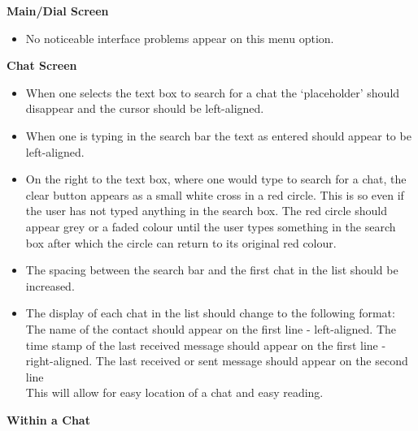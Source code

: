 \documentclass[11pt]{article}
\begin{document}
\textbf{Main/Dial Screen}
\begin{itemize}
\item No noticeable interface problems appear on this menu option.
\end{itemize}

\textbf{Chat Screen}
\begin{itemize}
\item	When one selects the text box to search for a chat the ‘placeholder’ should disappear and the cursor should be left-aligned.

\item When one is typing in the search bar the text as entered should appear to be left-aligned.

\item On the right to the text box, where one would type to search for a chat, the clear button appears as a small white cross in a red circle. This is so even if the user has not typed anything in the search box. The red circle should appear grey or a faded colour until the user types something in the search box after which the circle can return to its original red colour. 

\item The spacing between the search bar and the first chat in the list should be increased.

\item The display of each chat in the list should change to the following format:
\subitem The name of the contact should appear on the first line - left-aligned.
\subitem The time stamp of the last received message should appear on the first line - right-aligned.
\subitem The last received or sent message should appear on the second line\\
This will allow for easy location of a chat and easy reading.\\
\end{itemize}
\setlength\parindent{24pt}\textbf{Within a Chat}
\end{document}
